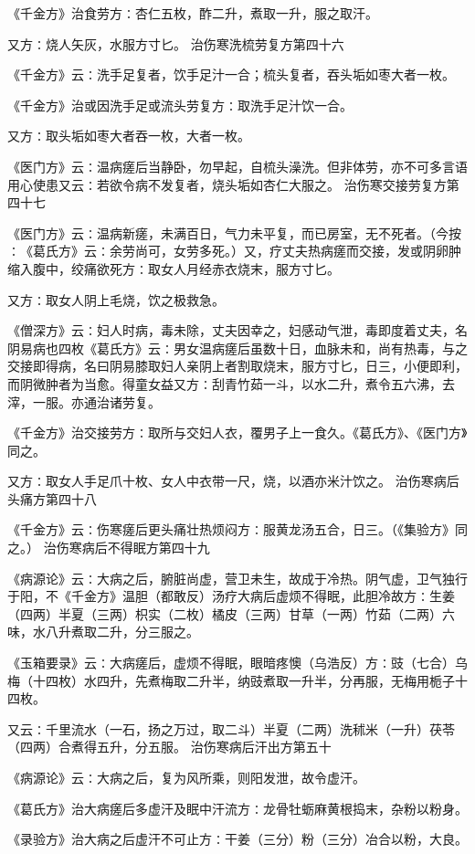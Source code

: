 \documentclass[a4paper,12pt,UTF8,twoside]{ctexbook}
\begin{document}
《千金方》治食劳方∶杏仁五枚，酢二升，煮取一升，服之取汗。

又方∶烧人矢灰，水服方寸匕。
治伤寒洗梳劳复方第四十六

《千金方》云∶洗手足复者，饮手足汁一合；梳头复者，吞头垢如枣大者一枚。

《千金方》治或因洗手足或流头劳复方∶取洗手足汁饮一合。

又方∶取头垢如枣大者吞一枚，大者一枚。

《医门方》云∶温病瘥后当静卧，勿早起，自梳头澡洗。但非体劳，亦不可多言语用心使患又云∶若欲令病不发复者，烧头垢如杏仁大服之。
治伤寒交接劳复方第四十七

《医门方》云∶温病新瘥，未满百日，气力未平复，而已房室，无不死者。（今按∶《葛氏方》云∶余劳尚可，女劳多死。）又，疗丈夫热病瘥而交接，发或阴卵肿缩入腹中，绞痛欲死方∶取女人月经赤衣烧末，服方寸匕。

又方∶取女人阴上毛烧，饮之极救急。

《僧深方》云∶妇人时病，毒未除，丈夫因幸之，妇感动气泄，毒即度着丈夫，名阴易病也四枚《葛氏方》云∶男女温病瘥后虽数十日，血脉未和，尚有热毒，与之交接即得病，名曰阴易膝取妇人亲阴上者割取烧末，服方寸匕，日三，小便即利，而阴微肿者为当愈。得童女益又方∶刮青竹茹一斗，以水二升，煮令五六沸，去滓，一服。亦通治诸劳复。

《千金方》治交接劳方∶取所与交妇人衣，覆男子上一食久。《葛氏方》、《医门方》同之。

又方∶取女人手足爪十枚、女人中衣带一尺，烧，以酒亦米汁饮之。
治伤寒病后头痛方第四十八

《千金方》云∶伤寒瘥后更头痛壮热烦闷方∶服黄龙汤五合，日三。（《集验方》同之。）
治伤寒病后不得眠方第四十九

《病源论》云∶大病之后，腑脏尚虚，营卫未生，故成于冷热。阴气虚，卫气独行于阳，不《千金方》温胆（都敢反）汤疗大病后虚烦不得眠，此胆冷故方∶生姜（四两）半夏（三两）枳实（二枚）橘皮（三两）甘草（一两）竹茹（二两）六味，水八升煮取二升，分三服之。

《玉箱要录》云∶大病瘥后，虚烦不得眠，眼暗疼懊（乌浩反）方∶豉（七合）乌梅（十四枚）水四升，先煮梅取二升半，纳豉煮取一升半，分再服，无梅用栀子十四枚。

又云∶千里流水（一石，扬之万过，取二斗）半夏（二两）洗秫米（一升）茯苓（四两）合煮得五升，分五服。
治伤寒病后汗出方第五十

《病源论》云∶大病之后，复为风所乘，则阳发泄，故令虚汗。

《葛氏方》治大病瘥后多虚汗及眠中汗流方∶龙骨牡蛎麻黄根捣末，杂粉以粉身。

《录验方》治大病之后虚汗不可止方∶干姜（三分）粉（三分）冶合以粉，大良。
\end{document}
